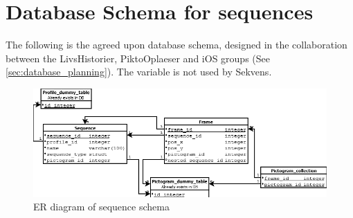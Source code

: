 \chapter{Database Schema for sequences}\label{app:DBschema}
The following is the agreed upon database schema, designed in the collaboration between the LivsHistorier, PiktoOplaeser and iOS groups (See \ref{sec:database_planning}). The variable  is not used by Sekvens.

\begin{figure} [h!]
\centering
\includegraphics[width=\textwidth]{Pics/sequencedb.png}
\caption{ER diagram of sequence schema}
\label{fig:erdiagram}
\end{figure}
